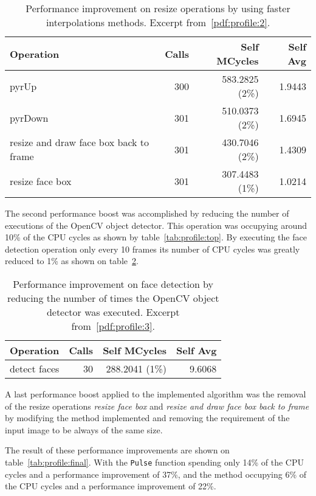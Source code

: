\begin{table}
  \centering
  \begin{tabular}{lrrr}
    \hline
    Operation & Calls & Self MCycles & Self Avg \\
    \hline
    pyrUp                                   & 300 & 583.2825 (2\%) & 1.9443 \\
    pyrDown                                 & 301 & 510.0373 (2\%) & 1.6945 \\
    resize and draw face box back to frame  & 301 & 430.7046 (2\%) & 1.4309 \\
    resize face box                         & 301 & 307.4483 (1\%) & 1.0214 \\
    \hline
  \end{tabular}
  \caption{
    Performance improvement on resize operations by using faster interpolations
    methods. Excerpt from~\ref{pdf:profile:2}.
  }
  \label{tab:profile:resize}
\end{table}

The second performance boost was accomplished by reducing the number of
executions of the OpenCV object detector. This operation was occupying
around 10\% of the CPU cycles as shown by table~\ref{tab:profile:top}.
By executing the face detection operation only every 10 frames its number
of CPU cycles was greatly reduced to 1\% as shown on
table~\ref{tab:profile:face}.

\begin{table}
  \centering
  \begin{tabular}{lrrr}
    \hline
    Operation & Calls & Self MCycles & Self Avg \\
    \hline
    detect faces &  30 & 288.2041 (1\%) & 9.6068 \\
    \hline
  \end{tabular}
  \caption{
    Performance improvement on face detection by reducing the number of times
    the OpenCV object detector was executed. Excerpt from~\ref{pdf:profile:3}.
  }
  \label{tab:profile:face}
\end{table}

A last performance boost applied to the implemented algorithm was the removal of
the resize operations \emph{resize face box} and
\emph{resize and draw face box back to frame} by modifying the \evm{} method
implemented and removing the requirement of the input image to be always of the
same size.

The result of these performance improvements are shown on
table~\ref{tab:profile:final}. With the \texttt{Pulse} function spending
only 14\% of the CPU cycles and a performance improvement of 37\%,
and the \evm{} method occupying 6\% of the CPU cycles and a performance
improvement of 22\%.

